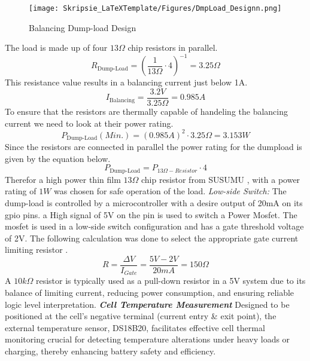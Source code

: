 \begin{figure}[h!]
\centering
\texttt{[image: Skripsie\_LaTeXTemplate/Figures/DmpLoad\_Designn.png]}
\caption{Balancing Dump-load Design}
\label{fig:MM_D3}
\end{figure}
\noindent
The load is made up of four $13\Omega$ chip resistors in parallel.
\begin{equation}
R_{\text{Dump-Load}} = (\frac{1}{13\Omega} \cdot 4)^{-1} = 3.25\Omega
\end{equation}
This resistance value results in a balancing current just below 1A.
\begin{equation}
I_{\text{Balancing}} = \frac{3.2V}{3.25\Omega} = 0.985A
\end{equation}
To ensure that the resistors are thermally capable of handeling the balancing current we need to look at their power rating.
\begin{equation}
P_{\text{Dump-Load}}(Min.) = (0.985A)^{2} \cdot 3.25\Omega = 3.153W
\end{equation}
Since the resistors are connected in parallel the power rating for the dumpload is given by the equation below.
\begin{equation}
P_{\text{Dump-Load}} = P_{13\Omega-Resistor} \cdot 4
\end{equation}
\noindent
Therefor a high power thin film $13\Omega$ chip resistor from SUSUMU \cite{CHIPrr}, with a power rating of $1W$ was chosen for safe operation of the load.\newline\newline
\noindent
\emph{Low-side Switch:}\label{subsubsec:LS_SW}\newline
\noindent
The dump-load is controlled by a microcontroller with a desire output of 20mA on its gpio pins. a High signal of 5V on the pin is used to switch a Power Mosfet. The mosfet is used in a low-side switch configuration and has a gate threshold voltage of 2V. The following calculation was done to select the appropriate gate current limiting resistor \cite{mos}.
\begin{equation}
R = \frac{\Delta V}{I_{Gate}} = \frac{5V - 2V}{20mA} = 150\Omega
\end{equation}
\noindent
A $10k\Omega$ resistor is typically used as a pull-down resistor in a 5V system due to its balance of limiting current, reducing power consumption, and ensuring reliable logic level interpretation.\newline\newline
\noindent
\textbf{\emph{Cell Temperature Measurement}}\label{subsubsec:ExtTemp_}\newline
\noindent
Designed to be positioned at the cell's negative terminal (current entry \& exit point), the external temperature sensor, DS18B20, facilitates effective cell thermal monitoring crucial for detecting temperature alterations under heavy loads or charging, thereby enhancing battery safety and efficiency.

